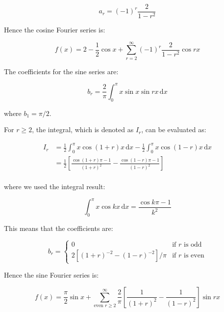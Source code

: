 \documentclass[12pt]{article}
\begin{document}
\begin{equation}
    a_{r} = (-1)^{r} \frac{2}{1 - r^{2}}
\end{equation}

Hence the cosine Fourier series is:

\begin{equation}
    f(x) = 2 - \frac{1}{2} \cos{x} + \sum_{r = 2}^{\infty} (-1)^{r} \frac{2}{1 - r^{2}} \cos{rx}
\end{equation}

The coefficients for the sine series are:

\begin{equation}
    b_{r} = \frac{2}{\pi} \int_{0}^{\pi} x \sin{x} \sin{rx} \, \mathrm{d}x
\end{equation}

where $b_{1} = \pi/2$.

For $r \ge 2$, the integral, which is denoted as $I_{r}$, can be evaluated as:

\begin{equation}
\begin{split}
    I_{r} &= \frac{1}{2} \int_{0}^{\pi} x \cos{(1 + r)x} \, \mathrm{d}x - \frac{1}{2} \int_{0}^{\pi} x \cos{(1 - r)x} \, \mathrm{d}x \\
    &= \frac{1}{2} \left[ \frac{\cos{(1 + r)\pi} - 1}{(1 + r)^{2}} - \frac{\cos{(1 - r)\pi} - 1}{(1 - r)^{2}} \right] \\
\end{split}
\end{equation}

where we used the integral result:

\begin{equation}
    \int_{0}^{\pi} x \cos{kx} \, \mathrm{d}x = \frac{\cos{k\pi} - 1}{k^{2}}
\end{equation}

This means that the coefficients are:

\begin{equation}
    b_{r} =
    \begin{cases}
        0 & \text{if } r \text{ is odd} \\
        2 \left[ (1 + r)^{-2} - (1 - r)^{-2} \right]/\pi & \text{if } r \text{ is even}
    \end{cases}
\end{equation}

Hence the sine Fourier series is:

\begin{equation}
    f(x) = \frac{\pi}{2} \sin{x} + \sum_{\text{even }r \ge 2}^{\infty} \frac{2}{\pi} \left[ \frac{1}{(1 + r)^{2}} - \frac{1}{(1 - r)^{2}} \right] \sin{rx}
\end{equation}
\end{document}
